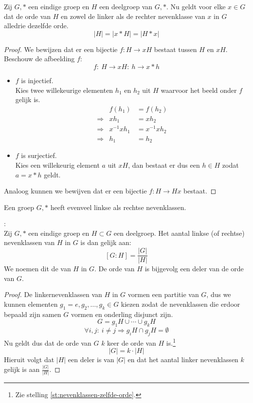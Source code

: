 \documentclass[main.tex]{subfiles}
\begin{document}
\begin{st}
  \label{st:nevenklassen-zelfde-orde}
  Zij $G,*$ een eindige groep en $H$ een deelgroep van $G,*$. Nu geldt voor elke $x\in G$ dat de orde van $H$ en zowel de linker als de rechter nevenklasse van $x$ in $G$ alledrie dezelfde orde.
  \[ |H| = |x*H| = |H*x| \]

  \begin{proof}
    We bewijzen dat er een bijectie $f: H \rightarrow xH$ bestaat tussen $H$ en $xH$.
    Beschouw de afbeelding $f$:
    \[ f:\ H\rightarrow xH:\ h \rightarrow x*h \]
    \begin{itemize}
    \item $f$ is injectief.\\
      Kies twee willekeurige elementen $h_{1}$ en $h_{2}$ uit $H$ waarvoor het beeld onder $f$ gelijk is.
      \[ 
      \begin{array}{rrl}
                  & f(h_{1})    &= f(h_{2})   \\ 
      \Rightarrow & xh_{1}      &= xh_{2}     \\
      \Rightarrow & x^{-1}xh_{1} &= x^{-1}xh_{2}\\
      \Rightarrow & h_{1}       &= h_{2}
      \end{array}
      \]
    \item $f$ is surjectief.\\
      Kies een willekeurig element $a$ uit $xH$, dan bestaat er dus een $h \in H$ zodat $a = x*h$ geldt.
    \end{itemize}
    Analoog kunnen we bewijven dat er een bijectie $f: H \rightarrow Hx$ bestaat.
  \end{proof}
\end{st}

\begin{st}
  Een groep $G,*$ heeft evenveel linkse als rechtse nevenklassen.

\end{st}

\begin{st}
  \label{st:stelling-van-lagrange}
  :\\
  Zij $G,*$ een eindige groep en $H \subset G$ een deelgroep. Het aantal linkse (of rechtse) nevenklassen van $H$ in $G$ is dan gelijk aan:
  \[ [G:H] = \frac{|G|}{|H|} \]
  We noemen dit de  van $H$ in $G$.
  De orde van $H$ is bijgevolg een deler van de orde van $G$.

  \begin{proof}
    De linkernevenklassen van $H$ in $G$ vormen een partitie van $G$, dus we kunnen elementen $g_{1} = e,g_{2},\dotsc,g_{k} \in G$ kiezen zodat de nevenklassen die erdoor bepaald zijn samen $G$ vormen en onderling disjunct zijn.
    \[ G = g_{1}H \cup \dotsb \cup g_{k}H \]
    \[ \forall i,j:\ i \neq j \Rightarrow g_{i}H \cap g_{j}H = \emptyset \]
    Nu geldt dus dat de orde van $G$ $k$ keer de orde van $H$ is.\footnote{Zie stelling \ref{st:nevenklassen-zelfde-orde}.}
    \[ |G| = k \cdot |H|\]
    Hieruit volgt dat $|H|$ een deler is van $|G|$ en dat het aantal linker nevenklassen $k$ gelijk is aan $\frac{|G|}{|H|}$.
  \end{proof}
\end{st}
\end{document}

